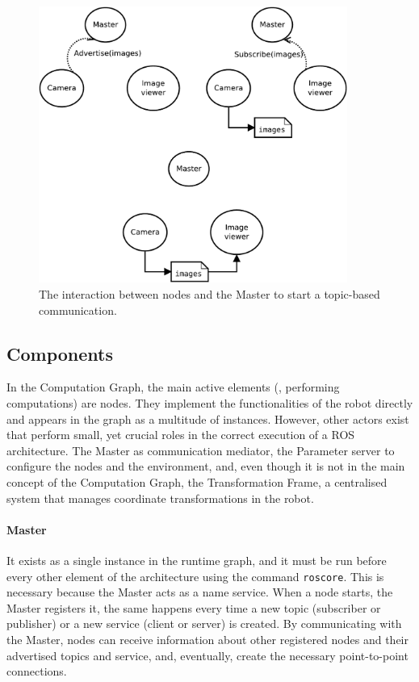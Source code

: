 \begin{figure}[t]
    \centering
    \includegraphics[width=0.9\textwidth]{gfx/ros/master_t}
    \caption{The interaction between nodes and the Master to start a topic-based communication.}\label{fig:ros-master}
\end{figure}

\subsection{Components}
In the Computation Graph, the main active elements (\ie, performing computations) are nodes. They implement the functionalities of the robot directly and appears in the graph as a multitude of instances. However, other actors exist that perform small, yet crucial roles in the correct execution of a ROS architecture. The Master as communication mediator, the Parameter server to configure the nodes and the environment, and, even though it is not in the main concept of the Computation Graph, the Transformation Frame, a centralised system that manages coordinate transformations in the robot.

\paragraph{Master} It exists as a single instance in the runtime graph, and it must be run before every other element of the architecture using the command \texttt{roscore}. This is necessary because the Master acts as a name service. When a node starts, the Master registers it, the same happens every time a new topic (subscriber or publisher) or a new service (client or server) is created. By communicating with the Master, nodes can receive information about other registered nodes and their advertised topics and service, and, eventually, create the necessary point-to-point connections.

